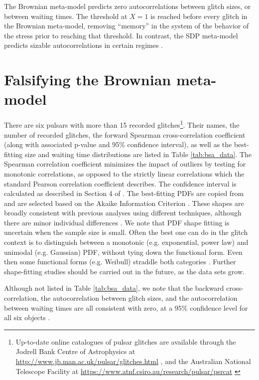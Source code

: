 The Brownian meta-model predicts zero autocorrelations between glitch sizes, or between waiting times. The threshold at $X=1$ is reached before every glitch in the Brownian meta-model, removing ``memory'' in the system of the behavior of the stress prior to reaching that threshold. In contrast, the SDP meta-model predicts sizable autocorrelations in certain regimes \citep{Carlin2019ac}.
 
\section{Falsifying the Brownian meta-model}
\label{sec:bsa_comp}
There are six pulsars with more than 15 recorded glitches\footnote{Up-to-date online catalogues of pulsar glitches are available through the Jodrell Bank Centre of Astrophysics at \url{http://www.jb.man.ac.uk/pulsar/glitches.html} \citep{Espinoza2011}, and the Australian National Telescope Facility at \url{https://www.atnf.csiro.au/research/pulsar/psrcat} \citep{Manchester2005}}. Their names, the number of recorded glitches, the forward Spearman cross-correlation coefficient (along with associated p-value and 95\% confidence interval), as well as the best-fitting size and waiting time distributions are listed in Table \ref{tab:bsa_data}. The Spearman correlation coefficient minimizes the impact of outliers by testing for monotonic correlations, as opposed to the strictly linear correlations which the standard Pearson correlation coefficient describes. The confidence interval is calculated as described in Section 4 of \citet{Carlin2019ac}. The best-fitting PDFs are copied from \citet{Fuentes2019} and are selected based on the Akaike Information Criterion \citep{Akaike1974}. These shapes are broadly consistent with previous analyses using different techniques, although there are minor individual differences \citep{Melatos2008, Howitt2018}. We note that PDF shape fitting is uncertain when the sample size is small. Often the best one can do in the glitch context is to distinguish between a monotonic (e.g. exponential, power law) and unimodal (e.g. Gaussian) PDF, without tying down the functional form. Even then some functional forms (e.g. Weibull) straddle both categories \citep{Antonopoulou2018}. Further shape-fitting studies should be carried out in the future, as the data sets grow. 

Although not listed in Table \ref{tab:bsa_data}, we note that the backward cross-correlation, the autocorrelation between glitch sizes, and the autocorrelation between waiting times are all consistent with zero, at a 95\% confidence level for all six objects \citep{Melatos2018, Carlin2019ac, Fuentes2019}.

